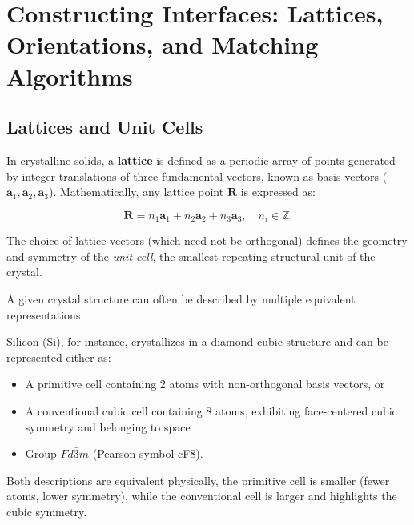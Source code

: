 \section{Constructing Interfaces: Lattices, Orientations, and Matching Algorithms}\label{sec:constructing_interfaces}


\subsection{Lattices and Unit Cells}


In crystalline solids, a \textbf{lattice} is defined as a periodic array of points generated by integer translations of
three fundamental vectors, known as basis vectors (\(\mathbf{a}_1, \mathbf{a}_2, \mathbf{a}_3\)). Mathematically, any
lattice point \(\mathbf{R}\) is expressed as\cite{vasp_bulk}:


\[
\mathbf{R} = n_1 \mathbf{a}_1 + n_2 \mathbf{a}_2 + n_3 \mathbf{a}_3, \quad n_i \in \mathbb{Z}.
\]


The choice of lattice vectors (which need not be orthogonal) defines the geometry and symmetry of the
\textit{unit cell}, the smallest repeating structural unit of the crystal.

A given crystal structure can often be described by multiple equivalent representations.

Silicon (Si), for instance, crystallizes in a diamond-cubic structure and can be represented either as:


\begin{itemize}
    \item A primitive cell containing 2 atoms with non-orthogonal basis vectors, or
    \item A conventional cubic cell containing 8 atoms, exhibiting face-centered cubic symmetry and belonging to space
    \item Group \(Fd\bar{3}m\) (Pearson symbol cF8)\cite{vasp_bulk}.
\end{itemize}


Both descriptions are equivalent physically, the primitive cell is smaller (fewer atoms, lower symmetry), while the
conventional cell is larger and highlights the cubic symmetry.

